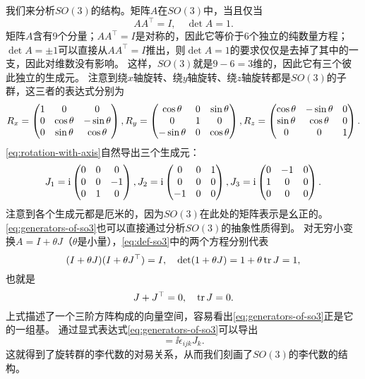 我们来分析$SO(3)$的结构。矩阵$A$在$SO(3)$中，当且仅当
\begin{equation}
    A A^\top = I, \quad \det A = 1.
    \label{eq:def-so3}
\end{equation}
矩阵$A$含有9个分量；$A A^\top = I$是对称的，因此它等价于6个独立的纯数量方程；
$\det A = \pm 1$可以直接从$A A^\top=I$推出，则$\det A = 1$的要求仅仅是去掉了其中的一支，因此对维数没有影响。
这样，$SO(3)$就是$9-6=3$维的，因此它有三个彼此独立的生成元。
注意到绕$x$轴旋转、绕$y$轴旋转、绕$z$轴旋转都是$SO(3)$的子群，这三者的表达式分别为
\begin{equation}
    R_x = \pmqty{1 & 0 & 0 \\ 0 & \cos \theta & -\sin \theta \\ 0 & \sin \theta & \cos \theta}, 
    R_y = \pmqty{\cos \theta & 0 & \sin \theta \\ 0 & 1 & 0 \\ - \sin \theta & 0 & \cos \theta}, 
    R_z = \pmqty{\cos \theta & - \sin \theta & 0 \\ \sin \theta & \cos \theta & 0 \\ 0 & 0 & 1}.
    \label{eq:rotation-with-axis}
\end{equation}
\eqref{eq:rotation-with-axis}自然导出三个生成元：
\begin{equation}
    J_1 = \ii \pmqty{0 & 0 & 0 \\ 0 & 0 & -1 \\ 0 & 1 & 0}, 
    J_2 = \ii \pmqty{0 & 0 & 1 \\ 0 & 0 & 0 \\ -1 & 0 & 0}, \\
    J_3 = \ii \pmqty{0 & -1 & 0 \\ 1 & 0 & 0 \\ 0 & 0 & 0}.
    \label{eq:generators-of-so3}
\end{equation}
注意到各个生成元都是厄米的，因为$SO(3)$在此处的矩阵表示是幺正的。
\eqref{eq:generators-of-so3}也可以直接通过分析$SO(3)$的抽象性质得到。
对无穷小变换$A = I + \theta J$（$\theta$是小量），\eqref{eq:def-so3}中的两个方程分别代表
\[
    (I+\theta J) (I + \theta J^\top) = I, \quad \det (1 + \theta J) = 1 + \theta \trace J = 1,
\]
也就是
\[
    J + J^\top = 0, \quad \trace J = 0.
\]
上式描述了一个三阶方阵构成的向量空间，容易看出\eqref{eq:generators-of-so3}正是它的一组基。
通过显式表达式\eqref{eq:generators-of-so3}可以导出
\begin{equation}
    [J_i, J_j] = \ii \epsilon_{ijk} J_k.
    \label{eq:lie-algebra-so3}
\end{equation}
这就得到了旋转群的李代数的对易关系，从而我们刻画了$SO(3)$的李代数的结构。

